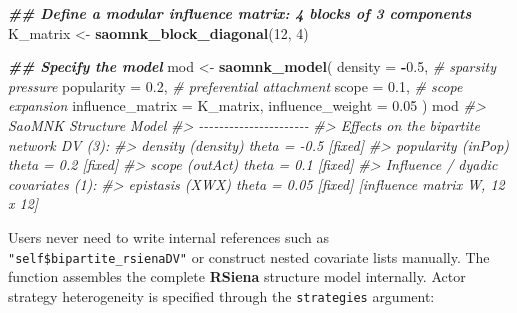 \documentclass[
]{article}
\newenvironment{Shaded}{\begin{snugshade}}{\end{snugshade}}
\newcommand{\AttributeTok}[1]{\textcolor[rgb]{0.13,0.29,0.53}{#1}}
\newcommand{\CommentTok}[1]{\textcolor[rgb]{0.56,0.35,0.01}{\textit{#1}}}
\newcommand{\DecValTok}[1]{\textcolor[rgb]{0.00,0.00,0.81}{#1}}
\newcommand{\DocumentationTok}[1]{\textcolor[rgb]{0.56,0.35,0.01}{\textbf{\textit{#1}}}}
\newcommand{\FloatTok}[1]{\textcolor[rgb]{0.00,0.00,0.81}{#1}}
\newcommand{\FunctionTok}[1]{\textcolor[rgb]{0.13,0.29,0.53}{\textbf{#1}}}
\newcommand{\NormalTok}[1]{#1}
\newcommand{\OtherTok}[1]{\textcolor[rgb]{0.56,0.35,0.01}{#1}}
\newcommand{\SpecialCharTok}[1]{\textcolor[rgb]{0.81,0.36,0.00}{\textbf{#1}}}
\begin{document}
\begin{Shaded}
\begin{Highlighting}[]
\DocumentationTok{\#\# Define a modular influence matrix: 4 blocks of 3 components}
\NormalTok{K\_matrix }\OtherTok{\textless{}{-}} \FunctionTok{saomnk\_block\_diagonal}\NormalTok{(}\DecValTok{12}\NormalTok{, }\DecValTok{4}\NormalTok{)}

\DocumentationTok{\#\# Specify the model}
\NormalTok{mod }\OtherTok{\textless{}{-}} \FunctionTok{saomnk\_model}\NormalTok{(}
  \AttributeTok{density    =} \SpecialCharTok{{-}}\FloatTok{0.5}\NormalTok{,     }\CommentTok{\# sparsity pressure}
  \AttributeTok{popularity =}  \FloatTok{0.2}\NormalTok{,     }\CommentTok{\# preferential attachment}
  \AttributeTok{scope      =}  \FloatTok{0.1}\NormalTok{,     }\CommentTok{\# scope expansion}
  \AttributeTok{influence\_matrix =}\NormalTok{ K\_matrix,}
  \AttributeTok{influence\_weight =} \FloatTok{0.05}
\NormalTok{)}
\NormalTok{mod}
\CommentTok{\#\textgreater{} SaoMNK Structure Model}
\CommentTok{\#\textgreater{} {-}{-}{-}{-}{-}{-}{-}{-}{-}{-}{-}{-}{-}{-}{-}{-}{-}{-}{-}{-}{-}{-}}
\CommentTok{\#\textgreater{} Effects on the bipartite network DV (3):}
\CommentTok{\#\textgreater{}   density (density)      theta =   {-}0.5  [fixed]}
\CommentTok{\#\textgreater{}   popularity (inPop)     theta =    0.2  [fixed]}
\CommentTok{\#\textgreater{}   scope (outAct)         theta =    0.1  [fixed]}
\CommentTok{\#\textgreater{} Influence / dyadic covariates (1):}
\CommentTok{\#\textgreater{}   epistasis (XWX)        theta =   0.05  [fixed]  [influence matrix W, 12 x 12]}
\end{Highlighting}
\end{Shaded}

Users never need to write internal references such as
\texttt{"self\$bipartite\_rsienaDV"} or construct nested covariate lists
manually. The function assembles the complete \textbf{RSiena} structure
model internally. Actor strategy heterogeneity is specified through the
\texttt{strategies} argument:
\end{document}
